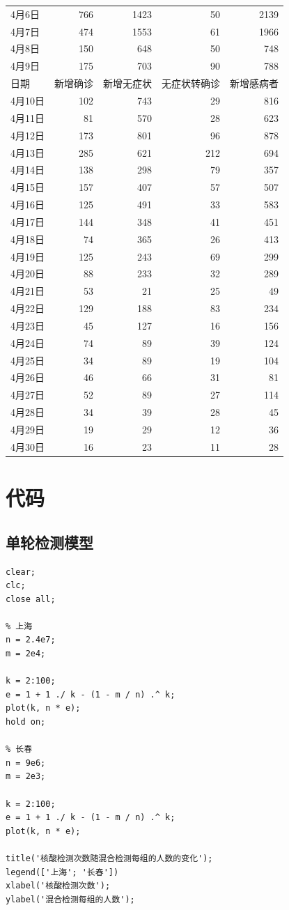 \documentclass[12pt]{article}
\begin{document}
\begin{longtable}[c]{|l|r|r|r|r|}
4月6日 & 766 & 1423 & 50 & 2139 \\
4月7日 & 474 & 1553 & 61 & 1966 \\
4月8日 & 150 & 648 & 50 & 748 \\
4月9日 & 175 & 703 & 90 & 788 \\
\hline
日期 & 新增确诊 & 新增无症状 & 无症状转确诊 & 新增感病者 \\
\hline
4月10日 & 102 & 743 & 29 & 816 \\
4月11日 & 81 & 570 & 28 & 623 \\
4月12日 & 173 & 801 & 96 & 878 \\
4月13日 & 285 & 621 & 212 & 694 \\
4月14日 & 138 & 298 & 79 & 357 \\
4月15日 & 157 & 407 & 57 & 507 \\
4月16日 & 125 & 491 & 33 & 583 \\
4月17日 & 144 & 348 & 41 & 451 \\
4月18日 & 74 & 365 & 26 & 413 \\
4月19日 & 125 & 243 & 69 & 299 \\
4月20日 & 88 & 233 & 32 & 289 \\
4月21日 & 53 & 21 & 25 & 49 \\
4月22日 & 129 & 188 & 83 & 234 \\
4月23日 & 45 & 127 & 16 & 156 \\
4月24日 & 74 & 89 & 39 & 124 \\
4月25日 & 34 & 89 & 19 & 104 \\
4月26日 & 46 & 66 & 31 & 81 \\
4月27日 & 52 & 89 & 27 & 114 \\
4月28日 & 34 & 39 & 28 & 45 \\
4月29日 & 19 & 29 & 12 & 36 \\
4月30日 & 16 & 23 & 11 & 28 \\
\hline
\end{longtable}

\newpage
\section{代码}

\subsection{单轮检测模型}

\begin{lstlisting}
clear;
clc;
close all;

% 上海
n = 2.4e7;
m = 2e4;

k = 2:100;
e = 1 + 1 ./ k - (1 - m / n) .^ k;
plot(k, n * e);
hold on;

% 长春
n = 9e6;
m = 2e3;

k = 2:100;
e = 1 + 1 ./ k - (1 - m / n) .^ k;
plot(k, n * e);

title('核酸检测次数随混合检测每组的人数的变化');
legend(['上海'; '长春'])
xlabel('核酸检测次数');
ylabel('混合检测每组的人数');
\end{lstlisting}
\end{document}

